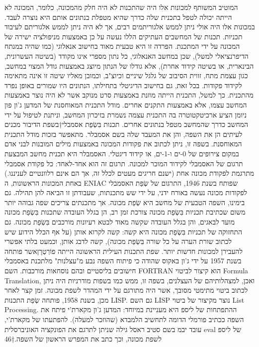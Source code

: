         המוטיב המשותף למכונות אלו היה שהתכנות לא היה חלק מהמכונה, כלומר, המכונה לא
        הייתה יכולה לטפל בתכנית שלה כדרך שהיא מטפלת בנתונים אותם היא נוצרה לעבד.
        במכונות אלו היה אולי ניתן לממש אלגוריתמים רבים, אך לא היה ניתן לממש אלגוריתם
        לעיבוד תכניות. תכנות של המחשבים העתיקים הללו נעשה על כן באמצעות מניפולציה ישירה
        של המכונה על ידי המתכנת. הפרדה זו היא טבעית מאוד בחישוב אנאלוגי (כמו שהיה
        במנתח הדיפרנציאלי למשל), שכן במחשב האנאלוגי, כל נתון מספרי אינו מקודד (בשיטה
        העשרונית, הבינארית, או בשיטה קידוד אחרת), אלא גודלו של הנתון מיוצג באמצעות גודל
        המצוי במחשב, כגון עצמת מתח, זווית הסיבוב של גלגל שיניים וכיוצ"ב, וכמובן מאליו
        שיטה זו אינה מתאימה לקידוד פקודות. בכל זאת, גם בחישוב הדיגיטלי בתחילתו,
        הנתונים היו שמורים באופן נפרד מהתכנית. כך למשל, התכנית הייתה מוזנת באמצעות סרט
        מנוקב אשר לא היה נוצר באמצעות המחשב עצמו, אלא באמצעות התקנים אחרים. מודל התכנית
        המאוחסנת של המדען ג'ון פון ניומן הציע ארכיטקטוטרה בה התכנית עצמה נשמרת בזיכרון
        המחשב, וניתנת לטיפול על ידי המחשב כדרך שהמחשב מטפל בנתונים אחרים. תכנות בִּשְׂפַת
        אסמבלי†{בשפת הדיבור מכנים לעיתים הן את השפה, והן את המעבד שלה בשם אסמבלר.} מתאפשר בזכות מודל התכנית המאוחסנת. בשפה זו, ניתן לכתוב את פקודות
        המכונה באמצעות מילים המובנות לבני אדם במקום צירופים של 0-ים ו-1-ים, או קידוד
        דיגטלי. האסמבלר היא תכנית מחשב המבצעת תרגום של האסמבלי לקידוד המוכר למכונה.
        תרגום זה הוא אחד-לאחד: כל פקודת אסמבלי מתרגמת לפקודת מכונה אחת (ישנם חריגים
        מעטים לכלל זה, אך הם אינם רלוונטיים לעניננו.) באחת המכונות הראשונות, ה ENIAC
        שפותח בשנת 1946, התרגום של שְׂפַת האסמבלי לפקודות מכונה נעשה באורח ידני, על ידי שש
        מתכנתות, שעבודתן זו הביאה להן תהילה. גם בימינו, השפה הטבעית של מחשב היא שְׂפַת
        מכונה. אך מתכנתים צריכים שפה גבוהה יותר משום שכתיבת תכניות בִּשְׂפַת מכונה צורכת
        זמן רב, הן בגלל העובדה שתכנות בִּשְׂפַת מכונה מועד לבאגים, והן בגלל העובדה שקשה
        מאוד לבטא רעיונות מורכבים בִּשְׂפַת מכונה. גם התחזוקה של תכניות בִּשְׂפַת מכונה היא
        קשה: קשה לקרוא אותן (על אף הכלל הידוע שיש לכתוב שורת הערה על כל שורה בִּשְׂפַת
        מכונה), קשה לדבג אותן, וכמעט בלתי אפשרי להעבירן למכונות חדשות יותר. שפת התכנות
        העילית הראשונה הייתה פוֹרְטְרָןאשר פותחה בשנת 1957 על ידי ג'ון באקוס שהודה כי פיתוח
        השפה נבע מ"עצלנות" מלתכנת באסמבלי חישובים בליסטיים ובהם נוסחאות מורכבות. השם
        FORTRAN הוא קיצור לביטוי Formula Translation, ואכן, למצהלותיהם של העצלנים, בשפה
        זו, ממש כמו בשפות מודרניות היה ניתן לכתוב ביטוי מתימטי מסובך, אשר היה מתורגם על
        ידי המהדר לשפת מכונה. זמן קצר לאחר מכן, בשנת 1958, פותחה שְׂפַת התכנות LISP. גם
        השם LISP נוצר מקיצור של ביטוי List Processing. ההתפתחות של ליספ היא מעניינת
        במיוחד: המדען ג'ון מקארת'י פיתח את השפה ככתיב פורמלי הדומה לתחשיב הלמבדא
        (שהוזכר למעלה). להפתעתו של מקארת'י, עובד יבמ בשם סטיב ראסל גילה שניתן לתרגם את
        הפונקציה האוניברסלית eval של ליספ לשפת מכונה, וכך כתב את המפרש הראשון של
        השפה.†{46}
        
